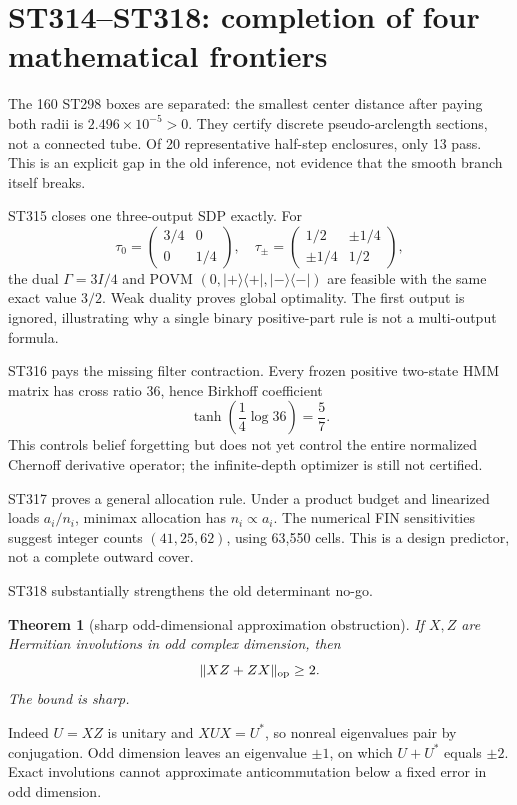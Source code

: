 \documentclass[11pt,a4paper]{article}
\newtheorem{theorem}{Theorem}[section]
\begin{document}
\section{ST314--ST318: completion of four mathematical frontiers}

The 160 ST298 boxes are separated: the smallest center distance after paying both radii is
$2.496\times10^{-5}>0$. They certify discrete pseudo-arclength sections, not a connected
tube. Of 20 representative half-step enclosures, only 13 pass. This is an explicit gap in
the old inference, not evidence that the smooth branch itself breaks.

ST315 closes one three-output SDP exactly. For
\[
\tau_0=\begin{pmatrix}3/4&0\\0&1/4\end{pmatrix},\quad
\tau_{\pm}=\begin{pmatrix}1/2&\pm1/4\\\pm1/4&1/2\end{pmatrix},
\]
the dual $\Gamma=3I/4$ and POVM $(0,|+\rangle\langle+|,|-\rangle\langle-|)$ are feasible
with the same exact value $3/2$. Weak duality proves global optimality. The first output is
ignored, illustrating why a single binary positive-part rule is not a multi-output formula.

ST316 pays the missing filter contraction. Every frozen positive two-state HMM matrix has
cross ratio $36$, hence Birkhoff coefficient
\[
\tanh\!\left(\frac14\log36\right)=\frac57.
\]
This controls belief forgetting but does not yet control the entire normalized Chernoff
derivative operator; the infinite-depth optimizer is still not certified.

ST317 proves a general allocation rule. Under a product budget and linearized loads
$a_i/n_i$, minimax allocation has $n_i\propto a_i$. The numerical FIN sensitivities suggest
integer counts $(41,25,62)$, using 63,550 cells. This is a design predictor, not a complete
outward cover.

ST318 substantially strengthens the old determinant no-go.
\begin{theorem}[sharp odd-dimensional approximation obstruction]
If $X,Z$ are Hermitian involutions in odd complex dimension, then
\[
\|XZ+ZX\|_{\rm op}\ge2.
\]
The bound is sharp.
\end{theorem}
Indeed $U=XZ$ is unitary and $XUX=U^*$, so nonreal eigenvalues pair by conjugation. Odd
dimension leaves an eigenvalue $\pm1$, on which $U+U^*$ equals $\pm2$. Exact involutions
cannot approximate anticommutation below a fixed error in odd dimension.
\end{document}
